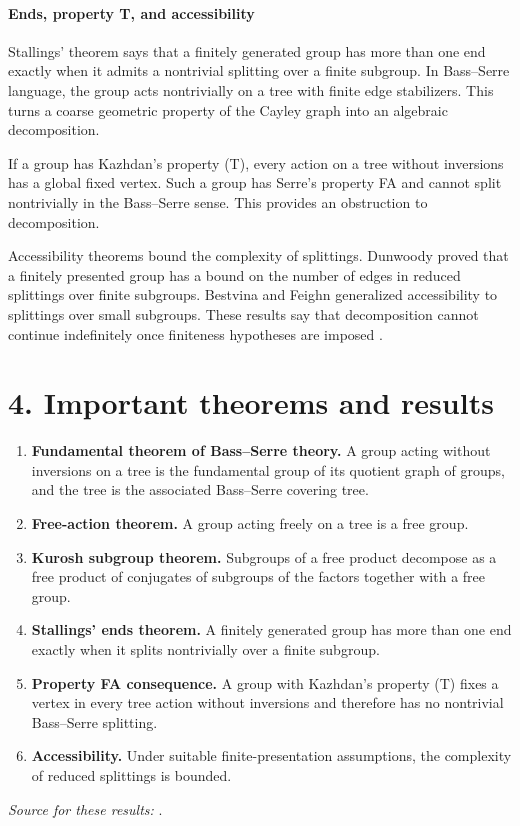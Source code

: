 \paragraph{Ends, property T, and accessibility}

Stallings' theorem says that a finitely generated group has more than one end exactly when it admits a nontrivial splitting over a finite subgroup. In Bass--Serre language, the group acts nontrivially on a tree with finite edge stabilizers. This turns a coarse geometric property of the Cayley graph into an algebraic decomposition.

If a group has Kazhdan's property (T), every action on a tree without inversions has a global fixed vertex. Such a group has Serre's property FA and cannot split nontrivially in the Bass--Serre sense. This provides an obstruction to decomposition.

Accessibility theorems bound the complexity of splittings. Dunwoody proved that a finitely presented group has a bound on the number of edges in reduced splittings over finite subgroups. Bestvina and Feighn generalized accessibility to splittings over small subgroups. These results say that decomposition cannot continue indefinitely once finiteness hypotheses are imposed \cite{bass_serre_theory_ref4,bass_serre_theory_ref5}.

\section*{4. Important theorems and results}
\begin{enumerate}[leftmargin=*,itemsep=0.35em]

\item \textbf{Fundamental theorem of Bass--Serre theory.} A group acting without inversions on a tree is the fundamental group of its quotient graph of groups, and the tree is the associated Bass--Serre covering tree.

\item \textbf{Free-action theorem.} A group acting freely on a tree is a free group.

\item \textbf{Kurosh subgroup theorem.} Subgroups of a free product decompose as a free product of conjugates of subgroups of the factors together with a free group.

\item \textbf{Stallings' ends theorem.} A finitely generated group has more than one end exactly when it splits nontrivially over a finite subgroup.

\item \textbf{Property FA consequence.} A group with Kazhdan's property (T) fixes a vertex in every tree action without inversions and therefore has no nontrivial Bass--Serre splitting.

\item \textbf{Accessibility.} Under suitable finite-presentation assumptions, the complexity of reduced splittings is bounded.
\end{enumerate}
\noindent\emph{Source for these results:} \cite{bass_serre_theory_ref1}.

